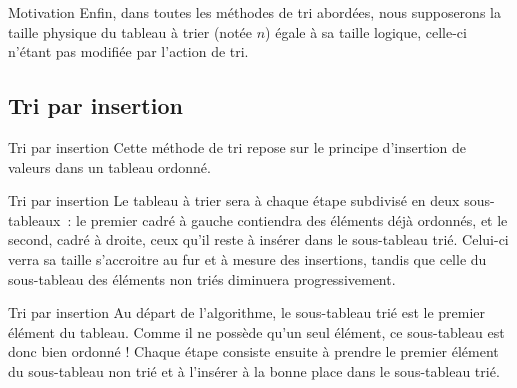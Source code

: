 \begin{frame}{Motivation}
	Enfin, dans toutes les méthodes de tri abordées, nous supposerons la
	taille physique du tableau à trier (notée $n$) égale à sa taille
	logique, celle-ci n’étant pas modifiée par l’action de tri.
\end{frame}

\subsection{Tri par insertion}

\begin{frame}{Tri par insertion}
	Cette méthode de tri repose sur le principe d’insertion de valeurs dans
	un tableau ordonné. 
\end{frame}

\begin{frame}{Tri par insertion}
	Le tableau à trier sera à chaque étape subdivisé en deux sous-tableaux~:
	le premier cadré à gauche contiendra des éléments déjà ordonnés, et le
	second, cadré à droite, ceux qu’il reste à insérer dans le sous-tableau
	trié. Celui-ci verra sa taille s’accroitre au fur et à mesure des
	insertions, tandis que celle du sous-tableau des éléments non triés
	diminuera progressivement.
\end{frame}

\begin{frame}{Tri par insertion}
	Au départ de l’algorithme, le sous-tableau trié est le premier élément
	du tableau. Comme il ne possède qu’un seul élément, ce sous-tableau est
	donc bien ordonné ! Chaque étape consiste ensuite à prendre le premier
	élément du sous-tableau non trié et à l’insérer à la bonne place dans
	le sous-tableau trié.
\end{frame}

